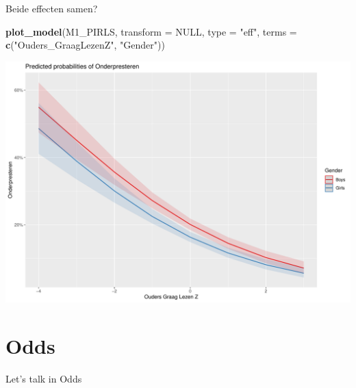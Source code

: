 \documentclass[
  10pt,
  ignorenonframetext,
]{beamer}
\newenvironment{Shaded}{\begin{snugshade}}{\end{snugshade}}
\newcommand{\DataTypeTok}[1]{\textcolor[rgb]{0.13,0.29,0.53}{#1}}
\newcommand{\KeywordTok}[1]{\textcolor[rgb]{0.13,0.29,0.53}{\textbf{#1}}}
\newcommand{\NormalTok}[1]{#1}
\newcommand{\OtherTok}[1]{\textcolor[rgb]{0.56,0.35,0.01}{#1}}
\newcommand{\StringTok}[1]{\textcolor[rgb]{0.31,0.60,0.02}{#1}}
\begin{document}
\begin{frame}[fragile]{Beide effecten samen?}
\protect\hypertarget{beide-effecten-samen}{}

\tiny

\begin{Shaded}
\begin{Highlighting}[]
\KeywordTok{plot_model}\NormalTok{(M1_PIRLS, }\DataTypeTok{transform =} \OtherTok{NULL}\NormalTok{, }\DataTypeTok{type =} \StringTok{"eff"}\NormalTok{, }\DataTypeTok{terms =} \KeywordTok{c}\NormalTok{(}\StringTok{"Ouders_GraagLezenZ"}\NormalTok{, }\StringTok{"Gender"}\NormalTok{))}
\end{Highlighting}
\end{Shaded}

\includegraphics[height=0.7\textheight]{C6_files/figure-beamer/unnamed-chunk-5-1}

\normalsize

\end{frame}

\hypertarget{odds}{%
\section{Odds}\label{odds}}

\begin{frame}{}
\protect\hypertarget{section-1}{}

\textcolor{uarood}{Let's talk in Odds}

\end{frame}
\end{document}

